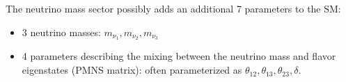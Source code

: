 The neutrino mass sector possibly adds an additional 7 parameters \cite{pmns} to the SM:
\begin{itemize}
\item 3 neutrino masses: $m_{\nu_{1}}, m_{\nu_{2}}, m_{\nu_{3}}$
\item 4 parameters describing the mixing between the neutrino mass and flavor eigenstates (PMNS matrix): often parameterized as $\theta_{12}, \theta_{13}, \theta_{23}, \delta$.
\end{itemize}
